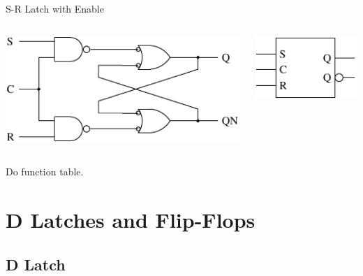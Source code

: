 \begin{frame}{S-R Latch with Enable}
  \begin{columns}
    \begin{column}{6cm}
      \begin{center}
        \includegraphics{SRLatchWithEnableCircuit}
      \end{center}
    \end{column}
    \begin{column}{6cm}
      \begin{center}
        \includegraphics{SRLatchWithEnableSchematic}
      \end{center}
    \end{column}
  \end{columns}
\end{frame}

Do function table.

\section{D Latches and Flip-Flops}

\subsection{D Latch}

